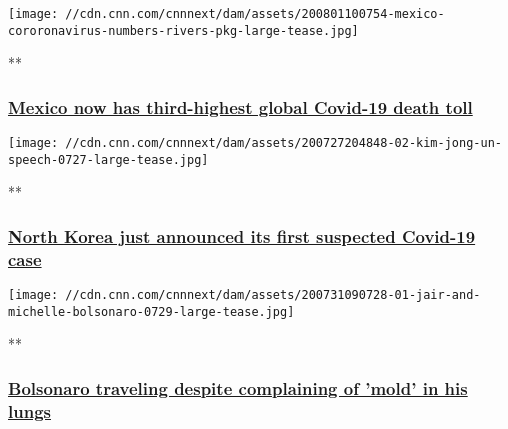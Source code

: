 \href{/videos/world/2020/08/01/mexico-coronavirus-death-toll-rivers-pkg-vpx.cnn/video/playlists/coronavirus-intl/}{}

\texttt{[image: //cdn.cnn.com/cnnnext/dam/assets/200801100754-mexico-cororonavirus-numbers-rivers-pkg-large-tease.jpg]}

**

\hypertarget{mexico-now-has-third-highest-global-covid-19-death-toll-1}{%
\subsubsection{\texorpdfstring{\href{/videos/world/2020/08/01/mexico-coronavirus-death-toll-rivers-pkg-vpx.cnn/video/playlists/coronavirus-intl/}{Mexico
now has third-highest global Covid-19 death
toll}}{Mexico now has third-highest global Covid-19 death toll}}\label{mexico-now-has-third-highest-global-covid-19-death-toll-1}}

\href{/videos/world/2020/08/01/north-korea-coronavirus-ripley-pkg-vpx.cnn/video/playlists/coronavirus-intl/}{}

\texttt{[image: //cdn.cnn.com/cnnnext/dam/assets/200727204848-02-kim-jong-un-speech-0727-large-tease.jpg]}

**

\hypertarget{north-korea-just-announced-its-first-suspected-covid-19-case-}{%
\subsubsection{\texorpdfstring{\href{/videos/world/2020/08/01/north-korea-coronavirus-ripley-pkg-vpx.cnn/video/playlists/coronavirus-intl/}{North
Korea just announced its first suspected Covid-19 case
}}{North Korea just announced its first suspected Covid-19 case }}\label{north-korea-just-announced-its-first-suspected-covid-19-case-}}

\href{/videos/world/2020/07/31/brazil-jair-michelle-bolsonaro-traveling-coronavirus-infection-lungs-npw-tsr-intl-vpx.cnn/video/playlists/coronavirus-intl/}{}

\texttt{[image: //cdn.cnn.com/cnnnext/dam/assets/200731090728-01-jair-and-michelle-bolsonaro-0729-large-tease.jpg]}

**

\hypertarget{bolsonaro-traveling-despite-complaining-of-mold-in-his-lungs}{%
\subsubsection{\texorpdfstring{\href{/videos/world/2020/07/31/brazil-jair-michelle-bolsonaro-traveling-coronavirus-infection-lungs-npw-tsr-intl-vpx.cnn/video/playlists/coronavirus-intl/}{Bolsonaro
traveling despite complaining of 'mold' in his
lungs}}{Bolsonaro traveling despite complaining of 'mold' in his lungs}}\label{bolsonaro-traveling-despite-complaining-of-mold-in-his-lungs}}

